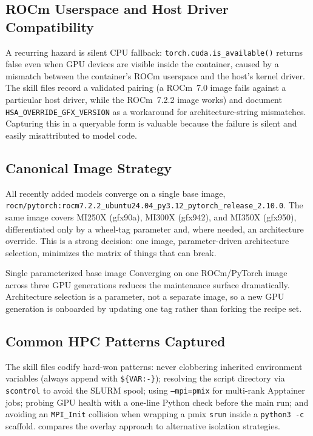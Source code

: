 \documentclass[11pt]{article}
\newcommand{\code}[1]{\texttt{#1}}
\begin{document}
\subsection{ROCm Userspace and Host Driver Compatibility}
A recurring hazard is silent CPU fallback: \code{torch.cuda.is\_available()} returns
false even when GPU devices are visible inside the container, caused by a mismatch
between the container's ROCm userspace and the host's kernel driver. The skill files
record a validated pairing (a ROCm~7.0 image fails against a particular host driver,
while the ROCm~7.2.2 image works) and document \code{HSA\_OVERRIDE\_GFX\_VERSION} as a
workaround for architecture-string mismatches. Capturing this in a queryable form is
valuable because the failure is silent and easily misattributed to model code.

\subsection{Canonical Image Strategy}
All recently added models converge on a single base image,
\code{rocm/pytorch:rocm7.2.2\_ubuntu24.04\_py3.12\_pytorch\_release\_2.10.0}. The same
image covers MI250X (gfx90a), MI300X (gfx942), and MI350X (gfx950), differentiated
only by a wheel-tag parameter and, where needed, an architecture override. This is a
strong decision: one image, parameter-driven architecture selection, minimizes the
matrix of things that can break.

\begin{strength}{Single parameterized base image}
Converging on one ROCm/PyTorch image across three GPU generations reduces the
maintenance surface dramatically. Architecture selection is a parameter, not a
separate image, so a new GPU generation is onboarded by updating one tag rather than
forking the recipe set.
\end{strength}

\subsection{Common HPC Patterns Captured}
The skill files codify hard-won patterns: never clobbering inherited environment
variables (always append with \code{\$\{VAR:-\}}); resolving the script directory via
\code{scontrol} to avoid the SLURM spool; using \code{--mpi=pmix} for multi-rank
Apptainer jobs; probing GPU health with a one-line Python check before the main run;
and avoiding an \code{MPI\_Init} collision when wrapping a pmix \code{srun} inside a
\code{python3 -c} scaffold.  compares the overlay approach to
alternative isolation strategies.
\end{document}
